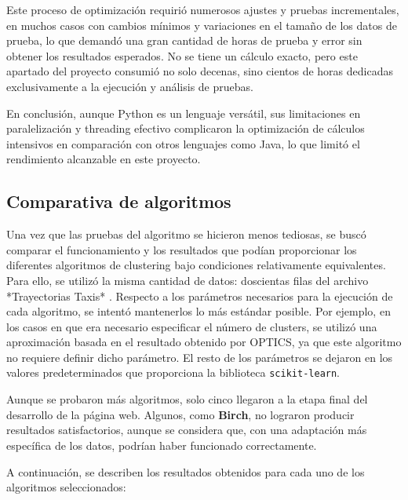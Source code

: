 Este proceso de optimización requirió numerosos ajustes y pruebas incrementales, en muchos casos con cambios mínimos y variaciones en el tamaño de los datos de prueba, lo que demandó una gran cantidad de horas de prueba y error sin obtener los resultados esperados. No se tiene un cálculo exacto, pero este apartado del proyecto consumió no solo decenas, sino cientos de horas dedicadas exclusivamente a la ejecución y análisis de pruebas.

En conclusión, aunque Python es un lenguaje versátil, sus limitaciones en paralelización y threading efectivo complicaron la optimización de cálculos intensivos en comparación con otros lenguajes como Java, lo que limitó el rendimiento alcanzable en este proyecto.

\subsection{Comparativa de algoritmos}

Una vez que las pruebas del algoritmo se hicieron menos tediosas, se buscó comparar el funcionamiento y los resultados que podían proporcionar los diferentes algoritmos de clustering bajo condiciones relativamente equivalentes. Para ello, se utilizó la misma cantidad de datos: doscientas filas del archivo *Trayectorias Taxis* \cite{trayectorias_taxis}. Respecto a los parámetros necesarios para la ejecución de cada algoritmo, se intentó mantenerlos lo más estándar posible. Por ejemplo, en los casos en que era necesario especificar el número de clusters, se utilizó una aproximación basada en el resultado obtenido por OPTICS, ya que este algoritmo no requiere definir dicho parámetro. El resto de los parámetros se dejaron en los valores predeterminados que proporciona la biblioteca \texttt{scikit-learn}.

Aunque se probaron más algoritmos, solo cinco llegaron a la etapa final del desarrollo de la página web. Algunos, como \textbf{Birch}, no lograron producir resultados satisfactorios, aunque se considera que, con una adaptación más específica de los datos, podrían haber funcionado correctamente.

A continuación, se describen los resultados obtenidos para cada uno de los algoritmos seleccionados:

